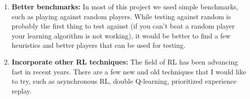 \documentclass[a4paper]{article}
\begin{document}
\begin{enumerate}

    \item \textbf{Better benchmarks:} In most of this project we used simple benchmarks, such as playing against random players. While testing against random is probably the first thing to test against (if you can't beat a random player your learning algorithm is not working), it would be better to find a few heuristics and better players that can be used for testing.

    \item \textbf{Incorporate other RL techniques:} The field of RL has been advancing fast in recent years. There are a few new and old techniques that I would like to try, such as asynchronous RL, double Q-learning, prioritized experience replay.

\end{enumerate}







\end{document}
